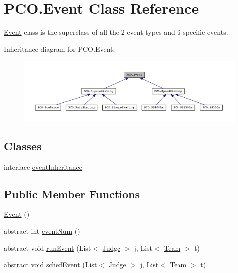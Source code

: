 \hypertarget{classPCO_1_1Event}{\section{P\+C\+O.\+Event Class Reference}
\label{classPCO_1_1Event}
}


\hyperlink{classPCO_1_1Event}{Event} class is the superclass of all the 2 event types and 6 specific events.  




Inheritance diagram for P\+C\+O.\+Event\+:\nopagebreak
\begin{figure}[H]
\begin{center}
\leavevmode
\includegraphics[width=350pt]{classPCO_1_1Event__inherit__graph}
\end{center}
\end{figure}
\subsection*{Classes}
\begin{DoxyCompactItemize}
\item 
interface \hyperlink{interfacePCO_1_1Event_1_1eventInheritance}{event\+Inheritance}
\end{DoxyCompactItemize}
\subsection*{Public Member Functions}
\begin{DoxyCompactItemize}
\item 
\hyperlink{classPCO_1_1Event_a55055f951cbfc76c9d62086b25aa93d0}{Event} ()
\item 
abstract int \hyperlink{classPCO_1_1Event_a89e26f29f5cfc92627bbb5a5e4ca1053}{event\+Num} ()
\item 
abstract void \hyperlink{classPCO_1_1Event_ad47d86904767dfebc731be328ec0958d}{run\+Event} (List$<$ \hyperlink{classPCO_1_1Judge}{Judge} $>$ j, List$<$ \hyperlink{classPCO_1_1Team}{Team} $>$ t)
\item 
abstract void \hyperlink{classPCO_1_1Event_a6a19f71e79d0f498ba74c9cd86c27eaa}{sched\+Event} (List$<$ \hyperlink{classPCO_1_1Judge}{Judge} $>$ j, List$<$ \hyperlink{classPCO_1_1Team}{Team} $>$ t)
\end{DoxyCompactItemize}
